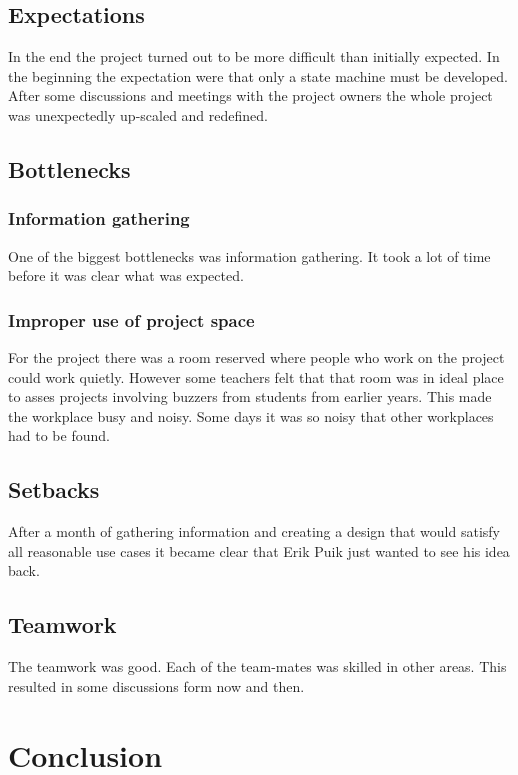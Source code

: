 \documentclass[12pt,a4paper]{report}
\begin{document}
\subsection{Expectations}
In the end the project turned out to be more difficult than initially expected.
In the beginning the expectation were that only a state machine must be developed.
After some discussions and meetings with the project owners the whole project was unexpectedly up-scaled and redefined.

\subsection{Bottlenecks}
\subsubsection{Information gathering}
One of the biggest bottlenecks was information gathering.
It took a lot of time before it was clear what was expected.

\subsubsection{Improper use of project space}
For the project there was a room reserved where people who work on the project could work quietly.
However some teachers felt that that room was in ideal place to asses projects involving buzzers from students from earlier years.
This made the workplace busy and noisy.
Some days it was so noisy that other workplaces had to be found.

\subsection{Setbacks}
After a month of gathering information and creating a design that would satisfy all reasonable use cases it became clear that Erik Puik just wanted to see his idea back.

\subsection{Teamwork}
The teamwork was good. 
Each of the team-mates was skilled in other areas.
This resulted in some discussions form now and then.

\section{Conclusion}
\end{document}
